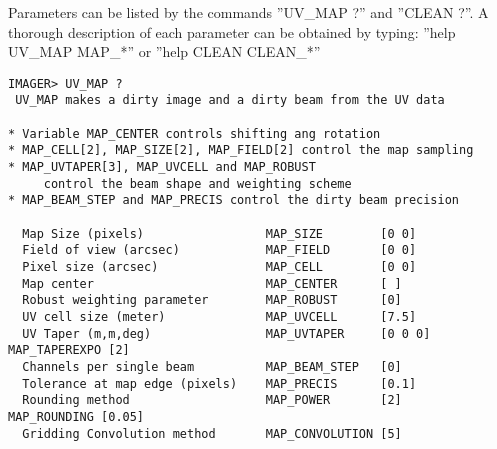 

Parameters can be listed by the commands ''UV\_MAP ?''  and ''CLEAN ?''.
A thorough description of each parameter can be obtained by typing: ''help UV\_MAP MAP\_*'' or ''help CLEAN CLEAN\_*''

\begin{verbatim}
IMAGER> UV_MAP ?
 UV_MAP makes a dirty image and a dirty beam from the UV data
 
* Variable MAP_CENTER controls shifting ang rotation
* MAP_CELL[2], MAP_SIZE[2], MAP_FIELD[2] control the map sampling
* MAP_UVTAPER[3], MAP_UVCELL and MAP_ROBUST
     control the beam shape and weighting scheme
* MAP_BEAM_STEP and MAP_PRECIS control the dirty beam precision
 
  Map Size (pixels)                 MAP_SIZE        [0 0]
  Field of view (arcsec)            MAP_FIELD       [0 0]
  Pixel size (arcsec)               MAP_CELL        [0 0] 
  Map center                        MAP_CENTER      [ ]      
  Robust weighting parameter        MAP_ROBUST      [0]
  UV cell size (meter)              MAP_UVCELL      [7.5]   
  UV Taper (m,m,deg)                MAP_UVTAPER     [0 0 0] MAP_TAPEREXPO [2] 
  Channels per single beam          MAP_BEAM_STEP   [0]
  Tolerance at map edge (pixels)    MAP_PRECIS      [0.1]
  Rounding method                   MAP_POWER       [2]     MAP_ROUNDING [0.05] 
  Gridding Convolution method       MAP_CONVOLUTION [5]
\end{verbatim}

% 
% 
% 
% 


